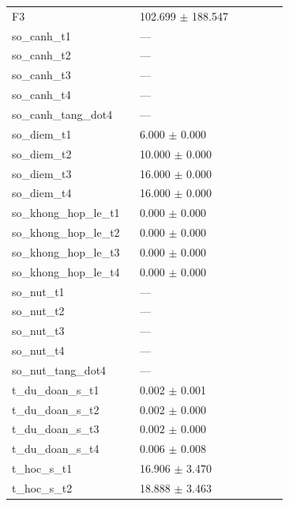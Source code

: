 \begin{longtable}{p{0.43\linewidth}p{0.50\linewidth}}
F3 & 102.699 $\pm$ 188.547 \\
so\_\allowbreak canh\_\allowbreak t1 & — \\
so\_\allowbreak canh\_\allowbreak t2 & — \\
so\_\allowbreak canh\_\allowbreak t3 & — \\
so\_\allowbreak canh\_\allowbreak t4 & — \\
so\_\allowbreak canh\_\allowbreak tang\_\allowbreak dot4 & — \\
so\_\allowbreak diem\_\allowbreak t1 & 6.000 $\pm$ 0.000 \\
so\_\allowbreak diem\_\allowbreak t2 & 10.000 $\pm$ 0.000 \\
so\_\allowbreak diem\_\allowbreak t3 & 16.000 $\pm$ 0.000 \\
so\_\allowbreak diem\_\allowbreak t4 & 16.000 $\pm$ 0.000 \\
so\_\allowbreak khong\_\allowbreak hop\_\allowbreak le\_\allowbreak t1 & 0.000 $\pm$ 0.000 \\
so\_\allowbreak khong\_\allowbreak hop\_\allowbreak le\_\allowbreak t2 & 0.000 $\pm$ 0.000 \\
so\_\allowbreak khong\_\allowbreak hop\_\allowbreak le\_\allowbreak t3 & 0.000 $\pm$ 0.000 \\
so\_\allowbreak khong\_\allowbreak hop\_\allowbreak le\_\allowbreak t4 & 0.000 $\pm$ 0.000 \\
so\_\allowbreak nut\_\allowbreak t1 & — \\
so\_\allowbreak nut\_\allowbreak t2 & — \\
so\_\allowbreak nut\_\allowbreak t3 & — \\
so\_\allowbreak nut\_\allowbreak t4 & — \\
so\_\allowbreak nut\_\allowbreak tang\_\allowbreak dot4 & — \\
t\_\allowbreak du\_\allowbreak doan\_\allowbreak s\_\allowbreak t1 & 0.002 $\pm$ 0.001 \\
t\_\allowbreak du\_\allowbreak doan\_\allowbreak s\_\allowbreak t2 & 0.002 $\pm$ 0.000 \\
t\_\allowbreak du\_\allowbreak doan\_\allowbreak s\_\allowbreak t3 & 0.002 $\pm$ 0.000 \\
t\_\allowbreak du\_\allowbreak doan\_\allowbreak s\_\allowbreak t4 & 0.006 $\pm$ 0.008 \\
t\_\allowbreak hoc\_\allowbreak s\_\allowbreak t1 & 16.906 $\pm$ 3.470 \\
t\_\allowbreak hoc\_\allowbreak s\_\allowbreak t2 & 18.888 $\pm$ 3.463 \\

\end{longtable}
